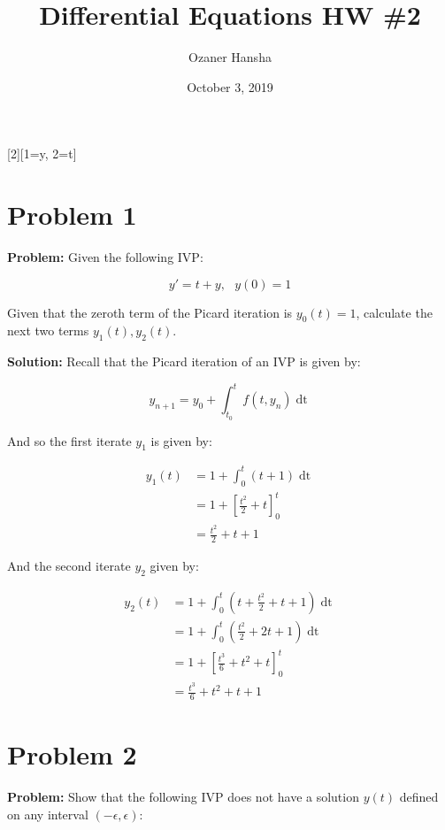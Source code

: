 \documentclass{article}
\begin{document}
\title{Differential Equations HW \#2}
\author{Ozaner Hansha}
\date{October 3, 2019}
\maketitle

[2][1=y, 2=t]{}
\newcommand*\eval[3]{\left[#1\right]_{#2}^{#3}}

\section*{Problem 1}
\noindent\textbf{Problem:} Given the following IVP:


\begin{equation*}
    y'=t+y,\,\,\,\, y(0)=1
\end{equation*}

Given that the zeroth term of the Picard iteration is $y_0(t)=1$, calculate the next two terms $y_1(t),y_2(t)$.
\bigskip

\noindent\textbf{Solution:} Recall that the Picard iteration of an IVP is given by:

\begin{equation*}
    y_{n+1}=y_0+\int_{t_0}^t f(t,y_n)\mathop{dt}
\end{equation*}

And so the first iterate $y_1$ is given by:

\begin{align*}
    y_1(t)&=1+\int_0^t (t+1)\mathop{dt}\\
    &=1+\eval{\frac{t^2}{2}+t}{0}{t}\\
    &=\frac{t^2}{2}+t+1
\end{align*}

And the second iterate $y_2$ given by:

\begin{align*}
    y_2(t)&=1+\int_0^t \left(t+\frac{t^2}{2}+t+1\right)\mathop{dt}\\
    &=1+\int_0^t \left(\frac{t^2}{2}+2t+1\right)\mathop{dt}\\
    &=1+\eval{\frac{t^3}{6}+t^2+t}{0}{t}\\
    &=\frac{t^3}{6}+t^2+t+1
\end{align*}
\pagebreak

\section*{Problem 2}
\noindent\textbf{Problem:} Show that the following IVP does not have a solution $y(t)$ defined on any interval $(-\epsilon, \epsilon)$:
\end{document}
